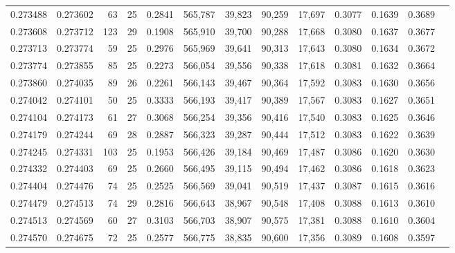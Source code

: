 \begin{tabular}{rrrrrrrrrrrrr}
0.273488 & 0.273602 &  63 &  25 &                                     0.2841 & 565,787 &  39,823 &  90,259 &  17,697 & 0.3077 & 0.1639 & 0.3689 \\
0.273608 & 0.273712 & 123 &  29 &                                     0.1908 & 565,910 &  39,700 &  90,288 &  17,668 & 0.3080 & 0.1637 & 0.3677 \\
0.273713 & 0.273774 &  59 &  25 &                                     0.2976 & 565,969 &  39,641 &  90,313 &  17,643 & 0.3080 & 0.1634 & 0.3672 \\
0.273774 & 0.273855 &  85 &  25 &                                     0.2273 & 566,054 &  39,556 &  90,338 &  17,618 & 0.3081 & 0.1632 & 0.3664 \\
0.273860 & 0.274035 &  89 &  26 &                                     0.2261 & 566,143 &  39,467 &  90,364 &  17,592 & 0.3083 & 0.1630 & 0.3656 \\
0.274042 & 0.274101 &  50 &  25 &                                     0.3333 & 566,193 &  39,417 &  90,389 &  17,567 & 0.3083 & 0.1627 & 0.3651 \\
0.274104 & 0.274173 &  61 &  27 &                                     0.3068 & 566,254 &  39,356 &  90,416 &  17,540 & 0.3083 & 0.1625 & 0.3646 \\
0.274179 & 0.274244 &  69 &  28 &                                     0.2887 & 566,323 &  39,287 &  90,444 &  17,512 & 0.3083 & 0.1622 & 0.3639 \\
0.274245 & 0.274331 & 103 &  25 &                                     0.1953 & 566,426 &  39,184 &  90,469 &  17,487 & 0.3086 & 0.1620 & 0.3630 \\
0.274332 & 0.274403 &  69 &  25 &                                     0.2660 & 566,495 &  39,115 &  90,494 &  17,462 & 0.3086 & 0.1618 & 0.3623 \\
0.274404 & 0.274476 &  74 &  25 &                                     0.2525 & 566,569 &  39,041 &  90,519 &  17,437 & 0.3087 & 0.1615 & 0.3616 \\
0.274479 & 0.274513 &  74 &  29 &                                     0.2816 & 566,643 &  38,967 &  90,548 &  17,408 & 0.3088 & 0.1613 & 0.3610 \\
0.274513 & 0.274569 &  60 &  27 &                                     0.3103 & 566,703 &  38,907 &  90,575 &  17,381 & 0.3088 & 0.1610 & 0.3604 \\
0.274570 & 0.274675 &  72 &  25 &                                     0.2577 & 566,775 &  38,835 &  90,600 &  17,356 & 0.3089 & 0.1608 & 0.3597 \\

\end{tabular}
